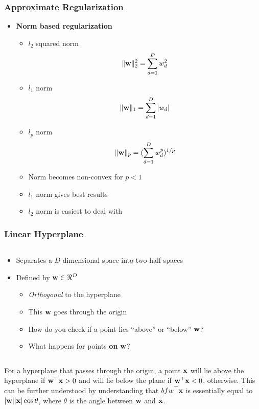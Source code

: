 \documentclass[10pt]{beamer}
\begin{document}
\begin{frame}
  \frametitle{Approximate Regularization}
  \begin{itemize}
  \item {\bf Norm based regularization}
    \begin{itemize}
    \item $l_2$ squared norm
      \[
      \Vert{\bf w}\Vert_2^2 = \sum_{d=1}^D w_d^2
      \]
    \item $l_1$ norm
      \[
      \Vert{\bf w}\Vert_1 = \sum_{d=1}^D \vert w_d\vert
      \]
    \item $l_p$ norm
      \[
      \Vert{\bf w}\Vert_p = (\sum_{d=1}^D  w^p_d)^{1/p}
      \]
    \item Norm becomes non-convex for $p < 1$
    \item $l_1$ norm gives best results
    \item $l_2$ norm is easiest to deal with
    \end{itemize}
  \end{itemize}
\end{frame}
\begin{frame}
      {
        \frametitle{Linear Hyperplane}
      }
      \begin{columns}
        \begin{column}{0.6\textwidth}
          \begin{itemize}
          \item Separates a $D$-dimensional space into two half-spaces
          \item Defined by ${\bf w} \in \Re^D$
            \begin{itemize}
            \item {\em Orthogonal} to the hyperplane
            \item This ${\bf w}$ goes through the origin
            \item How do you check if a point lies ``above'' or ``below'' ${\bf w}$?
            \item What happens for points {\bf on} ${\bf w}$?
            \end{itemize}
          \end{itemize}
    \end{column}
    \begin{column}{0.4\textwidth}
      \begin{figure}
        
      \end{figure}
    \end{column}
  \end{columns}
      {
        For a hyperplane that passes through the origin, a point ${\bf x}$ will lie above the hyperplane if ${\bf w}^\top{\bf x} > 0$ and will lie below the plane if ${\bf w}^\top{\bf x} < 0$, otherwise. This can be further understood by understanding that ${bf w}^\top{\bf x}$ is essentially equal to $|{\bf w}||{\bf x}|\cos{\theta}$, where $\theta$ is the angle between ${\bf w}$ and ${\bf x}$.
      }
\end{frame}
\end{document}
